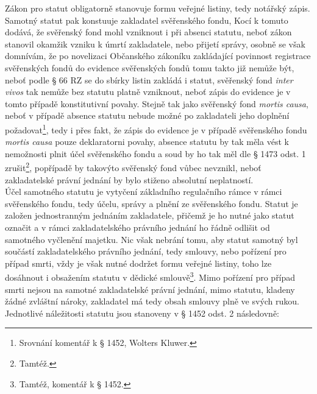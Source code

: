 \documentclass{article}
\begin{document}
Zákon pro statut obligatorně stanovuje formu veřejné listiny, tedy notářský zápis. Samotný statut pak konstuuje zakladatel svěřenského fondu, Kocí k tomuto dodává, že svěřenský fond mohl vzniknout i při absenci statutu, neboť zákon stanovil okamžik vzniku k úmrtí zakladatele, nebo přijetí správy, osobně se však domnívám, že po novelizaci Občanského zákoníku zakládající povinnost registrace svěřenských fondů do evidence svěřenských fondů tomu takto již nemůže být, neboť podle § 66 RZ se do sbírky listin zakládá i statut, svěřenský fond \textit{inter vivos} tak nemůže bez statutu platně vzniknout, neboť zápis do evidence je v tomto případě konstitutivní povahy. Stejně tak jako svěřenský fond \textit{mortis causa}, neboť v případě absence statutu nebude možné po zakladateli jeho doplnění požadovat\footnote{Srovnání komentář k § 1452, Wolters Kluwer.}, tedy i přes fakt, že zápis do evidence je v případě svěřenského fondu \textit{mortis causa} pouze deklaratorni povahy, absence statutu by tak měla vést k nemožnosti plnit účel svěřenského fondu a soud by ho tak měl dle § 1473 odst. 1 zrušit\footnote{Tamtéž.}, popřípadě by takovýto svěřenský fond vůbec nevznikl, neboť zakladatelské právní jednání by bylo stiženo absolutní neplatností.\\

Účel samotného statutu je vytyčení základního regulačního rámce v rámci svěřenského fondu, tedy účelu, správy a plnění ze svěřenského fondu. Statut je založen jednostranným jednáním zakladatele, přičemž je ho nutné jako statut označit a v rámci zakladatelského právního jednání ho řádně odlišit od samotného vyčlenění majetku. Nic však nebrání tomu, aby statut samotný byl součástí zakladatelského právního jednání, tedy smlouvy, nebo pořízení pro případ smrti, vždy je však nutné dodržet formu veřejné listiny, toho lze dosáhnout i obsažením statutu v dědické smlouvě\footnote{Tamtéž, komentář k § 1452.}. Mimo pořízení pro případ smrti nejsou na samotné zakladatelské právní jednání, mimo statutu, kladeny žádné zvláštní nároky, zakladatel má tedy obsah smlouvy plně ve svých rukou.\\

Jednotlivé náležitosti statutu jsou stanoveny v § 1452 odst. 2 následovně:\\
\end{document}
